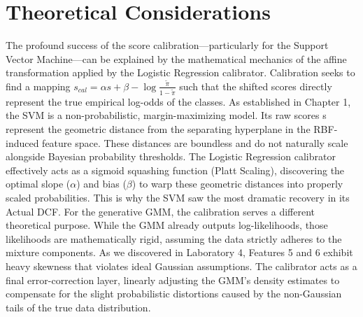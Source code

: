 \section{Theoretical Considerations}
The profound success of the score calibration—particularly for the Support Vector Machine—can be explained by the mathematical mechanics of the affine transformation applied by the Logistic Regression calibrator.
Calibration seeks to find a mapping $s_{cal} = \alpha s + \beta - \log \frac{\tilde{\pi}}{1-\tilde{\pi}}$ such that the shifted scores directly represent the true empirical log-odds of the classes.
As established in Chapter 1, the SVM is a non-probabilistic, margin-maximizing model. Its raw scores s represent the geometric distance from the separating hyperplane in the RBF-induced feature space. These distances are boundless and do not naturally scale alongside Bayesian probability thresholds. The Logistic Regression calibrator effectively acts as a sigmoid squashing function (Platt Scaling), discovering the optimal slope ($\alpha$) and bias ($\beta$) to warp these geometric distances into properly scaled probabilities. This is why the SVM saw the most dramatic recovery in its Actual DCF.
For the generative GMM, the calibration serves a different theoretical purpose. While the GMM already outputs log-likelihoods, those likelihoods are mathematically rigid, assuming the data strictly adheres to the mixture components. As we discovered in Laboratory 4, Features 5 and 6 exhibit heavy skewness that violates ideal Gaussian assumptions. The calibrator acts as a final error-correction layer, linearly adjusting the GMM's density estimates to compensate for the slight probabilistic distortions caused by the non-Gaussian tails of the true data distribution.
